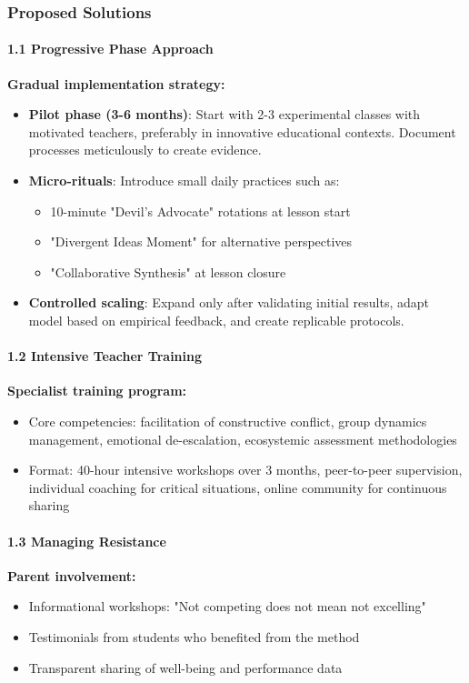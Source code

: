 \subsubsection*{Proposed Solutions}

\paragraph{1.1 Progressive Phase Approach}
\textbf{Gradual implementation strategy:}
\begin{itemize}
	\item \textbf{Pilot phase (3-6 months)}: Start with 2-3 experimental classes with motivated teachers, preferably in innovative educational contexts. Document processes meticulously to create evidence.
	\item \textbf{Micro-rituals}: Introduce small daily practices such as:
	\begin{itemize}
		\item 10-minute "Devil's Advocate" rotations at lesson start
		\item "Divergent Ideas Moment" for alternative perspectives
		\item "Collaborative Synthesis" at lesson closure
	\end{itemize}
	\item \textbf{Controlled scaling}: Expand only after validating initial results, adapt model based on empirical feedback, and create replicable protocols.
\end{itemize}

\paragraph{1.2 Intensive Teacher Training}
\textbf{Specialist training program:}
\begin{itemize}
	\item Core competencies: facilitation of constructive conflict, group dynamics management, emotional de-escalation, ecosystemic assessment methodologies
	\item Format: 40-hour intensive workshops over 3 months, peer-to-peer supervision, individual coaching for critical situations, online community for continuous sharing
\end{itemize}

\paragraph{1.3 Managing Resistance}
\textbf{Parent involvement:}
\begin{itemize}
	\item Informational workshops: "Not competing does not mean not excelling"
	\item Testimonials from students who benefited from the method
	\item Transparent sharing of well-being and performance data
\end{itemize}


